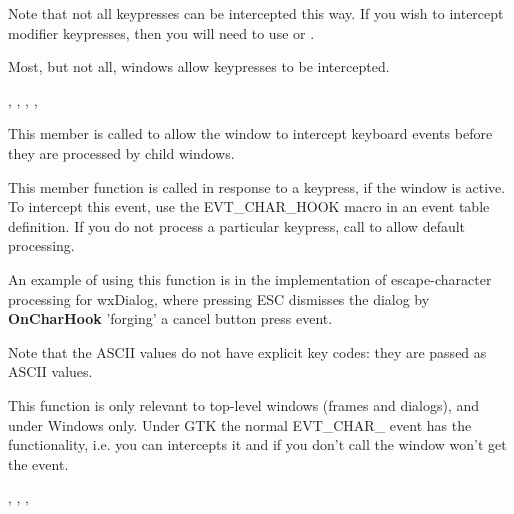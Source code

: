 Note that not all keypresses can be intercepted this way. If you wish to intercept modifier
keypresses, then you will need to use  or
.

Most, but not all, windows allow keypresses to be intercepted.


, ,\rtfsp
{}, ,\rtfsp
{}

\label{wxwindowoncharhook}


This member is called to allow the window to intercept keyboard events
before they are processed by child windows.




This member function is called in response to a keypress, if the window is active. To intercept this event,
use the EVT\_CHAR\_HOOK macro in an event table definition. If you do not process a particular
keypress, call  to allow default processing.

An example of using this function is in the implementation of escape-character processing for wxDialog,
where pressing ESC dismisses the dialog by {\bf OnCharHook} 'forging' a cancel button press event.

Note that the ASCII values do not have explicit key codes: they are passed as ASCII
values.

This function is only relevant to top-level windows (frames and dialogs), and under
Windows only. Under GTK the normal EVT\_CHAR\_ event has the functionality, i.e.
you can intercepts it and if you don't call 
the window won't get the event.


, ,\rtfsp
{},\rtfsp
{}

